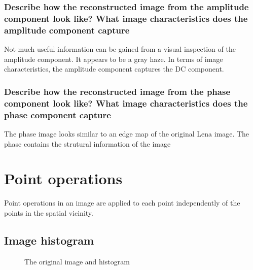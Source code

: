 \documentclass[article, 1.5space, letterpaper, 12pt, oneside, header, footer]{SydeClass}
\begin{document}
\subsubsection{Describe how the reconstructed image from the amplitude component look like? What image characteristics does the amplitude component capture}
Not much useful information can be gained from a visual inspection of the amplitude component. It appears to be a gray haze. In terms of image characteristics, the amplitude component captures the DC component.


\subsubsection{Describe how the reconstructed image from the phase component look like? What image characteristics does the phase component capture}
The phase image looks similar to an edge map of the original Lena image. The phase contains the strutural information of the image


\section{Point operations}

Point operations in an image are applied to each point independently of the points in the spatial vicinity.

\subsection{Image histogram}

\begin{figure}[ht]
\centering
	\caption{The original image and histogram}
	\label{fig:hist-original}
\end{figure}
\end{document}
